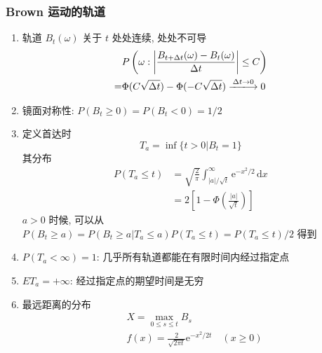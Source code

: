\documentclass[11pt,a4paper,twocolumn]{article} %
\numberwithin{equation}{section} %
\newcommand{\dif}{\,\mathrm d}
\newcommand\e{\mathrm{e}} %
\begin{document}
\subsubsection{Brown 运动的轨道} %
\label{ssub:brown_path}
\begin{enumerate}
	\item 轨道 $B_t(\omega)$ 关于 $t$ 处处连续, 处处不可导
	\begin{equation}
	\begin{split}
		&P\left(\omega: \left|
		\frac{B_{t+\Delta t}(\omega) - B_{t}(\omega)}{\Delta t}
		\right|\le C\right) \\
		=& \Phi(C\sqrt{\Delta t}) - \Phi(-C\sqrt{\Delta t}) 
		\xlongrightarrow{\Delta t \to 0} 0
	\end{split}
	\end{equation}
	\item 镜面对称性: $P(B_t\ge 0) = P(B_t < 0) = 1/2$
	\item 定义首达时
	\begin{equation}
		T_a = \inf\{ t>0 | B_t = 1\}
	\end{equation}
	其分布
	\begin{equation}
	\begin{split}
		P(T_a\le t) &= \sqrt{\frac 2\pi}\int_{|a|/\sqrt{t}}^\infty
		\e^{-x^2/2}\dif x \\
		&= 2\left[1-\Phi\left(\frac{|a|}{\sqrt t}\right)\right]
	\end{split}
	\end{equation}
	$a>0$ 时候, 可以从 $P(B_t\ge a) = P(B_t\ge a|T_a\le a)P(T_a\le t) 
	= P(T_a\le t)/2$ 得到
	\item $P(T_a < \infty) = 1$: 几乎所有轨道都能在有限时间内经过指定点
	\item $ET_a = +\infty$: 经过指定点的期望时间是无穷
	\item 最远距离的分布
	\begin{equation}
	\begin{split}
		& X = \max_{0\le s \le t} B_s\\
		& f(x) = \frac{2}{\sqrt{2\pi t}}\e^{-x^2/2t}\quad (x\ge 0)
	\end{split}
	\end{equation}
\end{enumerate}
\end{document}
